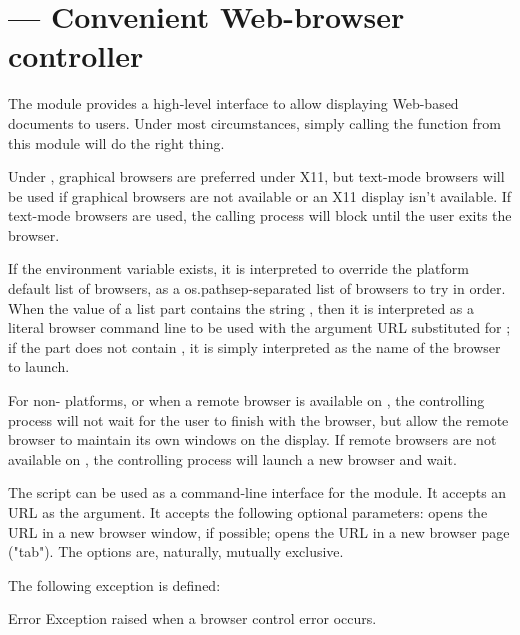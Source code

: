 \section{ ---
         Convenient Web-browser controller}


The  module provides a high-level interface to
allow displaying Web-based documents to users. Under most
circumstances, simply calling the  function from this
module will do the right thing.

Under \UNIX{}, graphical browsers are preferred under X11, but text-mode
browsers will be used if graphical browsers are not available or an X11
display isn't available.  If text-mode browsers are used, the calling
process will block until the user exits the browser.

If the environment variable  exists, it
is interpreted to override the platform default list of browsers, as a
os.pathsep-separated list of browsers to try in order.  When the value of
a list part contains the string , then it is 
interpreted as a literal browser command line to be used with the argument URL
substituted for ; if the part does not contain
, it is simply interpreted as the name of the browser to
launch.

For non-\UNIX{} platforms, or when a remote browser is available on
\UNIX{}, the controlling process will not wait for the user to finish
with the browser, but allow the remote browser to maintain its own
windows on the display.  If remote browsers are not available on \UNIX{},
the controlling process will launch a new browser and wait.

The script  can be used as a command-line interface
for the module. It accepts an URL as the argument. It accepts the following
optional parameters:  opens the URL in a new browser window,
if possible;  opens the URL in a new browser page ("tab"). The
options are, naturally, mutually exclusive.

The following exception is defined:

\begin{excdesc}{Error}
  Exception raised when a browser control error occurs.
\end{excdesc}

